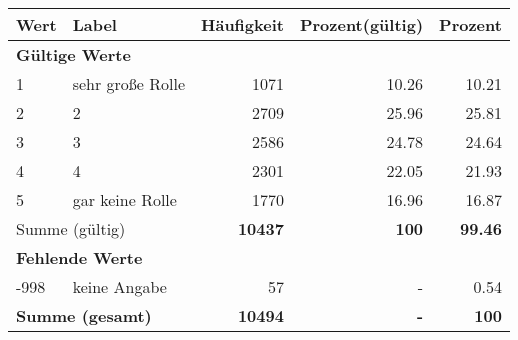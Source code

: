     \begin{longtable}{lXrrr}
     \toprule
     \textbf{Wert} & \textbf{Label} & \textbf{Häufigkeit} & \textbf{Prozent(gültig)} & \textbf{Prozent} \\
     \endhead
     \midrule
     \multicolumn{5}{l}{\textbf{Gültige Werte}}\\

     1 &
     \multicolumn{1}{X}{ sehr große Rolle   } &


       \num{1071} &
       \num[round-mode=places,round-precision=2]{10.26} &
         \num[round-mode=places,round-precision=2]{10.21} \\

     2 &
     \multicolumn{1}{X}{ 2   } &


       \num{2709} &
       \num[round-mode=places,round-precision=2]{25.96} &
         \num[round-mode=places,round-precision=2]{25.81} \\

     3 &
     \multicolumn{1}{X}{ 3   } &


       \num{2586} &
       \num[round-mode=places,round-precision=2]{24.78} &
         \num[round-mode=places,round-precision=2]{24.64} \\

     4 &
     \multicolumn{1}{X}{ 4   } &


       \num{2301} &
       \num[round-mode=places,round-precision=2]{22.05} &
         \num[round-mode=places,round-precision=2]{21.93} \\

     5 &
     \multicolumn{1}{X}{ gar keine Rolle   } &


       \num{1770} &
       \num[round-mode=places,round-precision=2]{16.96} &
         \num[round-mode=places,round-precision=2]{16.87} \\
     \midrule
     \multicolumn{2}{l}{Summe (gültig)} &
       \textbf{\num{10437}} &
     \textbf{\num{100}} &
       \textbf{\num[round-mode=places,round-precision=2]{99.46}} \\
     \multicolumn{5}{l}{\textbf{Fehlende Werte}}\\
       -998 &
       keine Angabe &
         \num{57} &
        - &
         \num[round-mode=places,round-precision=2]{0.54} \\
     \midrule
     \multicolumn{2}{l}{\textbf{Summe (gesamt)}} &
          \textbf{\num{10494}} &
        \textbf{-} &
        \textbf{\num{100}} \\
     \bottomrule
     \end{longtable}
     
